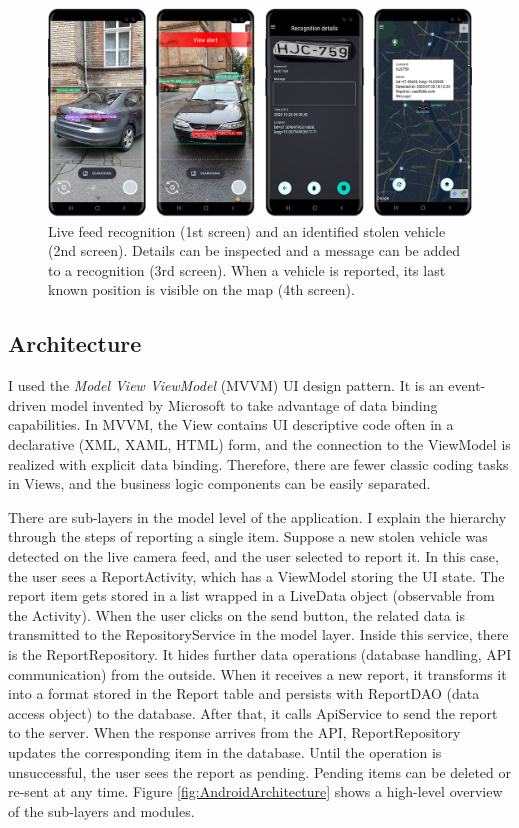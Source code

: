 \begin{figure}[H]
 \centerline{\includegraphics[width=1.0\columnwidth]{.//Figure/System/AppImages.png}}
 \caption{Live feed recognition (1st screen) and an identified stolen vehicle (2nd screen). Details can be inspected and a message can be added to a recognition (3rd screen). When a vehicle is reported, its last known position is visible on the map (4th screen).}
 \label{fig:AppImages}
\end{figure}

\subsection{Architecture}

I used the \textit{Model View ViewModel} (MVVM) UI design pattern. It is an event-driven model invented by Microsoft to take advantage of data binding capabilities. In MVVM, the View contains UI descriptive code often in a declarative (XML, XAML, HTML) form, and the connection to the ViewModel is realized with explicit data binding. Therefore, there are fewer classic coding tasks in Views, and the business logic components can be easily separated.

There are sub-layers in the model level of the application. I explain the hierarchy through the steps of reporting a single item. Suppose a new stolen vehicle was detected on the live camera feed, and the user selected to report it. In this case, the user sees a ReportActivity, which has a ViewModel storing the UI state. The report item gets stored in a list wrapped in a LiveData object (observable from the Activity). When the user clicks on the send button, the related data is transmitted to the RepositoryService in the model layer. Inside this service, there is the ReportRepository. It hides further data operations (database handling, API communication) from the outside. When it receives a new report, it transforms it into a format stored in the Report table and persists with ReportDAO (data access object) to the database. After that, it calls ApiService to send the report to the server. When the response arrives from the API, ReportRepository updates the corresponding item in the database. Until the operation is unsuccessful, the user sees the report as pending. Pending items can be deleted or re-sent at any time. Figure \ref{fig:AndroidArchitecture} shows a high-level overview of the sub-layers and modules.

